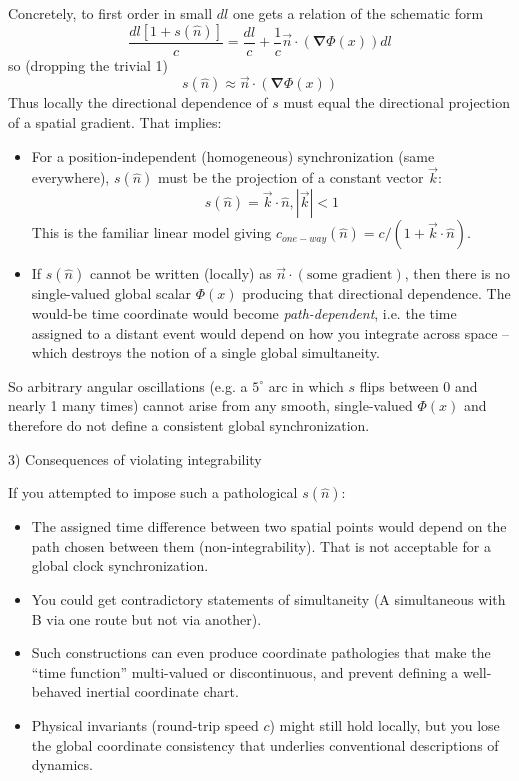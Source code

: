 \documentclass[a4paper]{article}
\theoremstyle{plain}
\theoremstyle{definition}
\newcommand{\vect}[1]{\vec{#1}}
\newcommand{\hatvec}[1]{\hat{#1}}
\newcommand{\del}{\bm{\nabla}}
\begin{document}
Concretely, to first order in small $dl$ one gets a relation of the
schematic form
\begin{equation}
\frac{dl[1+s(\hatvec{n})]}{c}
  = \frac{dl}{c} + \frac{1}{c} \vect{n} \cdot (\del \Phi(x)) dl
\end{equation}
so (dropping the trivial 1)
\begin{equation}
s(\hatvec{n}) \approx \vect{n} \cdot (\del \Phi (x))
\end{equation}
Thus locally the directional dependence of $s$ must equal the
directional projection of a spatial gradient.  That implies:
\begin{itemize}
\item For a position-independent (homogeneous) synchronization (same
  everywhere), $s(\hatvec{n})$ must be the projection of a constant
  vector $\vect{k}$:
\begin{equation}
s(\hatvec{n}) = \vect{k} \cdot \hatvec{n}, |\vect{k}| < 1
\end{equation}
  This is the familiar linear model giving
  $c_{one-way}(\hatvec{n}) = c/(1 + \vect{k} \cdot \hatvec{n})$.
\item If $s(\hatvec{n})$ cannot be written (locally) as $\vect{n}
  \cdot (\text{some gradient})$, then there is no single-valued global
  scalar $\Phi(x)$ producing that directional dependence.  The
  would-be time coordinate would become {\em path-dependent}, i.e. the
  time assigned to a distant event would depend on how you integrate
  across space -- which destroys the notion of a single global
  simultaneity.
\end{itemize}

So arbitrary angular oscillations (e.g. a $5^{\circ}$ arc in which $s$
flips between 0 and nearly 1 many times) cannot arise from any smooth,
single-valued $\Phi(x)$ and therefore do not define a consistent
global synchronization.

3) Consequences of violating integrability

If you attempted to impose such a pathological $s(\hatvec{n})$:
\begin{itemize}
\item The assigned time difference between two spatial points would
  depend on the path chosen between them (non-integrability).  That is
  not acceptable for a global clock synchronization.
\item You could get contradictory statements of simultaneity (A
  simultaneous with B via one route but not via another).
\item Such constructions can even produce coordinate pathologies that
  make the ``time function'' multi-valued or discontinuous, and
  prevent defining a well-behaved inertial coordinate chart.
\item Physical invariants (round-trip speed $c$) might still hold
  locally, but you lose the global coordinate consistency that
  underlies conventional descriptions of dynamics.
\end{itemize}
\end{document}
